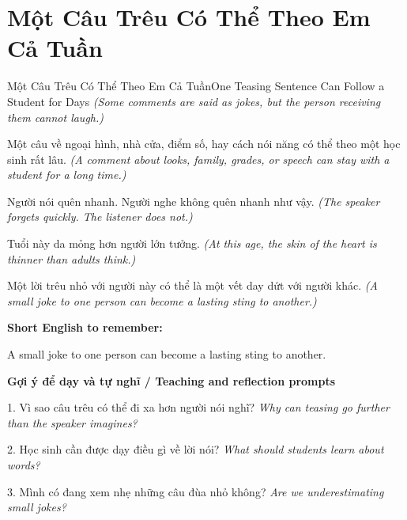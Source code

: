 \section{Một Câu Trêu Có Thể Theo Em Cả Tuần}
\begin{truyen}{Một Câu Trêu Có Thể Theo Em Cả Tuần}{One Teasing Sentence Can Follow a Student for Days}
\textit{(Some comments are said as jokes, but the person receiving them cannot laugh.)}

Một câu về ngoại hình, nhà cửa, điểm số, hay cách nói năng có thể theo một học sinh rất lâu.
\textit{(A comment about looks, family, grades, or speech can stay with a student for a long time.)}

Người nói quên nhanh. Người nghe không quên nhanh như vậy.
\textit{(The speaker forgets quickly. The listener does not.)}

Tuổi này da mỏng hơn người lớn tưởng.
\textit{(At this age, the skin of the heart is thinner than adults think.)}

\end{truyen}

\begin{baihoc}
Một lời trêu nhỏ với người này có thể là một vết day dứt với người khác.
\textit{(A small joke to one person can become a lasting sting to another.)}
\end{baihoc}

\begin{ghinhoanh}
\textbf{Short English to remember:}

A small joke to one person can become a lasting sting to another.

\end{ghinhoanh}

\begin{tuhocnhanh}
\textbf{Gợi ý để dạy và tự nghĩ / Teaching and reflection prompts}

1. Vì sao câu trêu có thể đi xa hơn người nói nghĩ? \textit{Why can teasing go further than the speaker imagines?}

2. Học sinh cần được dạy điều gì về lời nói? \textit{What should students learn about words?}

3. Mình có đang xem nhẹ những câu đùa nhỏ không? \textit{Are we underestimating small jokes?}
\end{tuhocnhanh}
\ngancach

